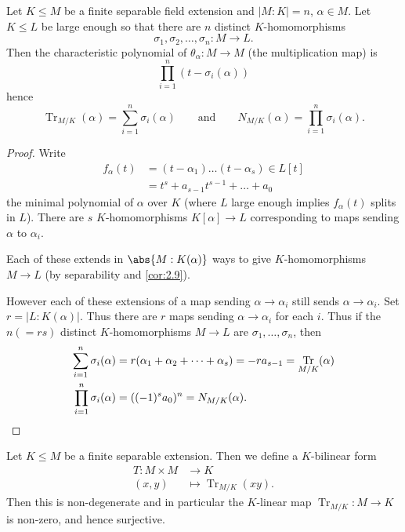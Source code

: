 \documentclass{article}
\DeclareMathOperator{\Tr}{Tr}
\begin{document}
\begin{nthm}\label{thm:2.20}
    Let $K \leq M$ be a finite separable field extension and $|M:K| = n$, $\alpha \in M$.
    Let $K \leq L$ be large enough so that there are $n$ distinct $K$-homomorphisms
    \begin{equation*}
        \sigma_1, \sigma_2, \dotsc, \sigma_n: M \longrightarrow L.
    \end{equation*}
    Then the characteristic polynomial of $\theta_\alpha:M \to M$ (the multiplication map) is
    \begin{equation*}
        \prod_{i=1}^n (t-\sigma_i(\alpha))
    \end{equation*}
    hence
    \begin{equation*}
        \Tr_{M/K} (\alpha) = \sum_{i=1}^n \sigma_i(\alpha) \qquad \text{and} \qquad N_{M/K}(\alpha) = \prod_{i=1}^n \sigma_i(\alpha).
    \end{equation*}
\end{nthm}
\begin{proof}
    Write
    \begin{align*}
        f_\alpha(t) &= (t-\alpha_1) \dotsc (t-\alpha_s) \in L[t] \\
                    &= t^s + a_{s-1} t^{s-1} + \dotsc + a_0
    \end{align*}
    the minimal polynomial of $\alpha$ over $K$ (where $L$ large enough implies $f_\alpha(t)$ splits in $L$).
    There are $s$ $K$-homomorphisms $K[\alpha] \to L$ corresponding to maps sending $\alpha$ to $\alpha_i$.

    Each of these extends in $\abs{M:K(\alpha)}$ ways to give $K$-homomorphisms $M \to L$ (by separability and \cref{cor:2.9}).

    However each of these extensions of a map sending $\alpha \to \alpha_i$ still sends $\alpha \to \alpha_i$.
    Set $r = |L:K(\alpha)|$. Thus there are $r$ maps sending $\alpha \to \alpha_i$ for each $i$.
    Thus if the $n (=rs)$ distinct $K$-homomorphisms $M \to L$ are $\sigma_1, \dotsc, \sigma_n$, then
    \begin{align*}
        \sum_{i=1}^n \sigma_i(\alpha) &= r(\alpha_1 + \alpha_2 + \dotsb + \alpha_s) = -r a_{s-1} = \Tr_{M/K}(\alpha) \\
        \prod_{i=1}^n \sigma_i(\alpha) &= ((-1)^s a_0)^n = N_{M/K}(\alpha). \qedhere
    \end{align*}
\end{proof}

\begin{nthm}\label{thm:2.21}
    Let $K \leq M$ be a finite separable extension.
    Then we define a $K$-bilinear form
    \begin{align*}
        T: M \times M &\rightarrow K \\
        (x, y) &\longmapsto \Tr_{M/K} (xy).
    \end{align*}
    Then this is non-degenerate and in particular the $K$-linear map $\Tr_{M/K}:M \to K$ is non-zero, and hence surjective.
\end{nthm}
\end{document}
